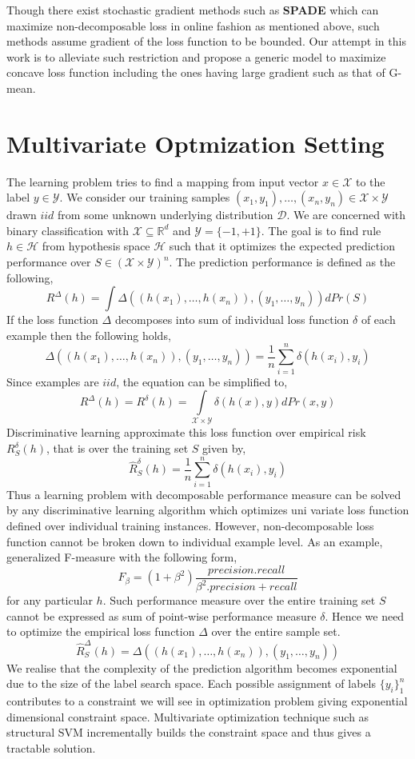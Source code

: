 \documentclass{article} %
\begin{document}
Though there exist stochastic gradient methods such as \textbf{SPADE} which can maximize non-decomposable loss in online fashion\cite{c2} as mentioned above, such methods assume gradient of the loss function to be bounded. Our attempt in this work is to alleviate such restriction and propose a generic model to maximize concave loss function including the ones having large gradient such as that of G-mean.


\section{Multivariate Optmization Setting}
The learning problem tries to find a mapping from input vector $x \in \mathcal{X}$ to the label $y \in \mathcal{Y}$. We consider our training samples $(x_1,y_1),\ldots,(x_n,y_n) \in \mathcal{X} \times \mathcal{Y}$ drawn $\textit{iid}$ from some unknown underlying distribution $\mathcal{D}$. We are concerned with binary classification with $\mathcal{X} \subseteq \mathbb{R}^d$ and $\mathcal{Y}=\{-1,+1\}$. The goal is to find rule $h \in \mathcal{H}$ from hypothesis space $\mathcal{H}$ such that it optimizes the expected prediction performance over $S \in (\mathcal{X} \times \mathcal{Y})^n$. The prediction performance is defined as the following,
$$
R^{\Delta}(h) = \int \Delta((h(x_1),\ldots,h(x_n)),(y_1,\ldots,y_n))dPr(S)
$$
If the loss function $\Delta$ decomposes into sum of individual loss function $\delta$ of each example then the following holds,
$$
\Delta((h(x_1),\ldots,h(x_n)),(y_1,\ldots,y_n)) = \frac{1}{n} \sum\limits_{i=1}^{n}\delta(h(x_i),y_i)
$$
Since examples are $iid$, the equation can be simplified to,
$$
R^{\Delta}(h) = R^{\delta}(h) = \int\limits_{\mathcal{X}\times\mathcal{Y}}\delta(h(x),y)dPr(x,y)$$
Discriminative learning approximate this loss function over empirical risk $R^{\delta}_{S}(h)$, that is over the training set $S$ given by,
$$
\hat{R}^{\delta}_{S}(h) = \frac{1}{n}\sum\limits_{i=1}^{n}\delta(h(x_i),y_i)
$$
Thus a learning problem with decomposable performance measure can be solved by any discriminative learning algorithm which optimizes uni variate loss function defined over individual training instances. However, non-decomposable loss function cannot be broken down to individual example level. As an example, generalized F-measure with the following form,
$$
F_\beta = (1+\beta^2) \frac{precision . recall}{\beta^2 . precision + recall}
$$
for any particular $h$. Such performance measure over the entire training set $S$ cannot be expressed as sum of point-wise performance measure $\delta$. Hence we need to optimize the empirical loss function $\Delta$ over the entire sample set.
$$
\hat{R}^{\Delta}_{S}(h)=\Delta((h(x_1),\ldots,h(x_n)),(y_1,\ldots,y_n))
$$
We realise that the complexity of the prediction algorithm becomes exponential due to the size of the label search space. Each possible assignment of labels $\{y_i\}_1^n$ contributes to a constraint we will see in optimization problem giving exponential dimensional constraint space. Multivariate optimization technique such as structural SVM incrementally builds the constraint space and thus gives a tractable solution.
\end{document}

